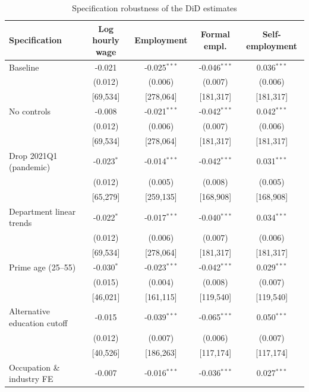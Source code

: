 \begin{table}[!tbp]\centering
\caption{Specification robustness of the DiD estimates}\label{tab:robspec}
\begin{threeparttable}
\footnotesize
\setlength{\tabcolsep}{4pt}
\begin{tabular}{lcccc}
\toprule
Specification & Log hourly wage & Employment & Formal empl. & Self-employment \\
\midrule
Baseline & -0.021 & -0.025$^{***}$ & -0.046$^{***}$ & 0.036$^{***}$ \\
 & (0.012) & (0.006) & (0.007) & (0.006) \\
 & \footnotesize[69,534] & \footnotesize[278,064] & \footnotesize[181,317] & \footnotesize[181,317] \\
No controls & -0.008 & -0.021$^{***}$ & -0.042$^{***}$ & 0.042$^{***}$ \\
 & (0.012) & (0.006) & (0.007) & (0.006) \\
 & \footnotesize[69,534] & \footnotesize[278,064] & \footnotesize[181,317] & \footnotesize[181,317] \\
Drop 2021Q1 (pandemic) & -0.023$^{*}$ & -0.014$^{***}$ & -0.042$^{***}$ & 0.031$^{***}$ \\
 & (0.012) & (0.005) & (0.008) & (0.005) \\
 & \footnotesize[65,279] & \footnotesize[259,135] & \footnotesize[168,908] & \footnotesize[168,908] \\
Department linear trends & -0.022$^{*}$ & -0.017$^{***}$ & -0.040$^{***}$ & 0.034$^{***}$ \\
 & (0.012) & (0.006) & (0.007) & (0.006) \\
 & \footnotesize[69,534] & \footnotesize[278,064] & \footnotesize[181,317] & \footnotesize[181,317] \\
Prime age (25--55) & -0.030$^{*}$ & -0.023$^{***}$ & -0.042$^{***}$ & 0.029$^{***}$ \\
 & (0.015) & (0.004) & (0.008) & (0.007) \\
 & \footnotesize[46,021] & \footnotesize[161,115] & \footnotesize[119,540] & \footnotesize[119,540] \\
Alternative education cutoff & -0.015 & -0.039$^{***}$ & -0.065$^{***}$ & 0.050$^{***}$ \\
 & (0.012) & (0.007) & (0.006) & (0.007) \\
 & \footnotesize[40,526] & \footnotesize[186,263] & \footnotesize[117,174] & \footnotesize[117,174] \\
Occupation \& industry FE & -0.007 & -0.016$^{***}$ & -0.036$^{***}$ & 0.027$^{***}$ \\

\end{tabular}
\end{threeparttable}
\end{table}
